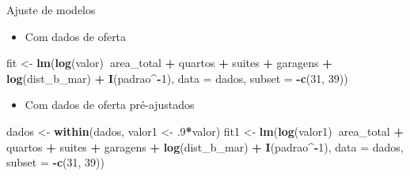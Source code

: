 \documentclass[9pt,ignorenonframetext,aspectratio=169]{beamer}
\newenvironment{Shaded}{\begin{snugshade}}{\end{snugshade}}
\newcommand{\DataTypeTok}[1]{\textcolor[rgb]{0.13,0.29,0.53}{#1}}
\newcommand{\DecValTok}[1]{\textcolor[rgb]{0.00,0.00,0.81}{#1}}
\newcommand{\FloatTok}[1]{\textcolor[rgb]{0.00,0.00,0.81}{#1}}
\newcommand{\KeywordTok}[1]{\textcolor[rgb]{0.13,0.29,0.53}{\textbf{#1}}}
\newcommand{\NormalTok}[1]{#1}
\newcommand{\OperatorTok}[1]{\textcolor[rgb]{0.81,0.36,0.00}{\textbf{#1}}}
\newcommand{\StringTok}[1]{\textcolor[rgb]{0.31,0.60,0.02}{#1}}
\providecommand{\tightlist}{%
  \setlength{\itemsep}{0pt}\setlength{\parskip}{0pt}}
\begin{document}
\begin{frame}[fragile]{Ajuste de modelos}
\protect\hypertarget{ajuste-de-modelos}{}

\begin{itemize}
\tightlist
\item
  Com dados de oferta
\end{itemize}

\begin{Shaded}
\begin{Highlighting}[]
\NormalTok{fit <-}\StringTok{ }\KeywordTok{lm}\NormalTok{(}\KeywordTok{log}\NormalTok{(valor)}\OperatorTok{~}\NormalTok{area_total }\OperatorTok{+}\StringTok{ }\NormalTok{quartos }\OperatorTok{+}\StringTok{ }\NormalTok{suites }\OperatorTok{+}\StringTok{ }\NormalTok{garagens }\OperatorTok{+}\StringTok{ }
\StringTok{            }\KeywordTok{log}\NormalTok{(dist_b_mar) }\OperatorTok{+}\StringTok{ }\KeywordTok{I}\NormalTok{(padrao}\OperatorTok{^-}\DecValTok{1}\NormalTok{), }\DataTypeTok{data =}\NormalTok{ dados, }\DataTypeTok{subset =} \OperatorTok{-}\KeywordTok{c}\NormalTok{(}\DecValTok{31}\NormalTok{, }\DecValTok{39}\NormalTok{))}
\end{Highlighting}
\end{Shaded}

\begin{itemize}
\tightlist
\item
  Com dados de oferta pré-ajustados
\end{itemize}

\begin{Shaded}
\begin{Highlighting}[]
\NormalTok{dados <-}\StringTok{ }\KeywordTok{within}\NormalTok{(dados, valor1 <-}\StringTok{ }\FloatTok{.9}\OperatorTok{*}\NormalTok{valor)}
\NormalTok{fit1 <-}\StringTok{ }\KeywordTok{lm}\NormalTok{(}\KeywordTok{log}\NormalTok{(valor1)}\OperatorTok{~}\NormalTok{area_total }\OperatorTok{+}\StringTok{ }\NormalTok{quartos }\OperatorTok{+}\StringTok{ }\NormalTok{suites }\OperatorTok{+}\StringTok{ }\NormalTok{garagens }\OperatorTok{+}\StringTok{ }
\StringTok{            }\KeywordTok{log}\NormalTok{(dist_b_mar) }\OperatorTok{+}\StringTok{ }\KeywordTok{I}\NormalTok{(padrao}\OperatorTok{^-}\DecValTok{1}\NormalTok{), }\DataTypeTok{data =}\NormalTok{ dados, }\DataTypeTok{subset =} \OperatorTok{-}\KeywordTok{c}\NormalTok{(}\DecValTok{31}\NormalTok{, }\DecValTok{39}\NormalTok{))}
\end{Highlighting}
\end{Shaded}

\end{frame}
\end{document}
